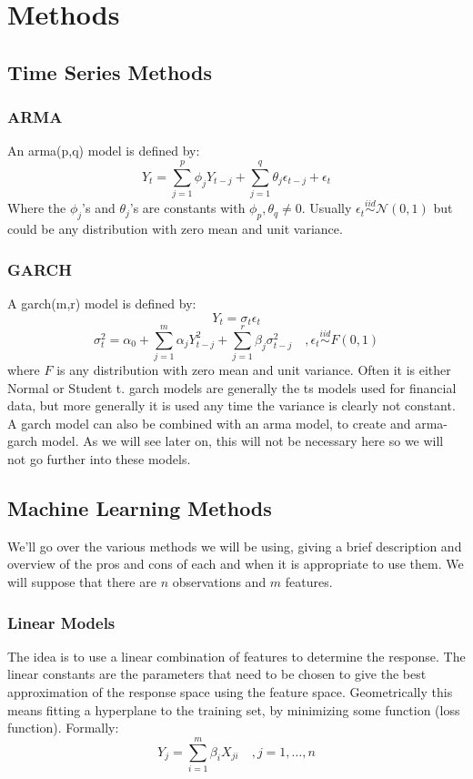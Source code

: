\chapter{Methods}

\section{Time Series Methods}
\subsection{ARMA}
An \acrfull{arma}(p,q) model is defined by:
$$
Y_t = \sum_{j=1}^p \phi_j Y_{t-j} + \sum_{j=1}^q \theta_j \epsilon_{t-j} + \epsilon_t
$$
Where the $\phi_j$'s and $\theta_j$'s are constants with $\phi_p , \theta_q \neq 0$. Usually $\epsilon_t \stackrel{iid}{\sim} \mathcal{N}(0,1)$ but could be any distribution with zero mean and unit variance.
\subsection{GARCH}
A \acrfull{garch}(m,r) model is defined by:
$$
Y_t = \sigma_t \epsilon_t
$$
$$
\sigma_t^2 = \alpha_0 + \sum_{j=1}^m \alpha_j Y_{t-j}^2 + \sum_{j=1}^r \beta_j \sigma_{t-j}^2
\quad, \epsilon_t \stackrel{iid}{\sim} F(0,1)
$$
where $F$ is any distribution with zero mean and unit variance. Often it is either Normal or Student t.
\acrshort{garch} models are generally the \acrlong{ts} models used for financial data, but more generally it is used any time the variance is clearly not constant. A \acrshort{garch} model can also be combined with an \acrshort{arma} model, to create and \acrshort{arma}-\acrshort{garch} model. As we will see later on, this will not be necessary here so we will not go further into these models.

\section{Machine Learning Methods}
We'll go over the various methods we will be using, giving a brief description and overview of the pros and cons of each and when it is appropriate to use them.
We will suppose that there are $n$ observations and $m$ features.


\subsection{Linear Models}
The idea is to use a linear combination of features to determine the response. The linear constants are the parameters that need to be chosen to give the best approximation of the response space using the feature space. Geometrically this means fitting a hyperplane to the training set, by minimizing some function (loss function).
Formally:
$$
Y_j = \sum_{i=1}^m \beta_{i} X_{ji} \quad, j=1,\dots,n
$$

